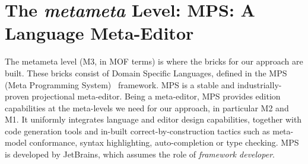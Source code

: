 \section{The \emph{metameta} Level: MPS: A Language Meta-Editor}
\label{sec:metameta}
\vspace{-.2cm}
The metameta level (M3, in MOF terms) is where the bricks for our approach are
built. These bricks consist of Domain Specific Languages, defined in the MPS
(Meta Programming System)~\cite{mps} framework. MPS is a stable and
industrially-proven projectional meta-editor. Being a meta-editor, MPS provides edition
capabilities at the meta-levels we need for our approach, in particular M2 and
M1. It uniformly integrates language and editor design capabilities, together
with code generation tools and in-built correct-by-construction tactics such as meta-model
conformance, syntax highlighting, auto-completion or type checking.  
MPS is developed by JetBrains, which assumes the role of \emph{framework
developer}. 

